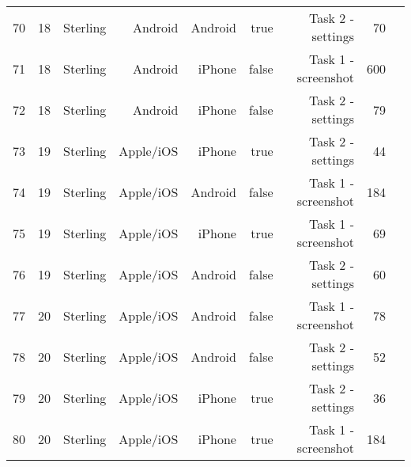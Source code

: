 \documentclass[conference]{IEEEtran}
\begin{document}
\begin{table}[!htp]
\begin{tabular}{lrrrrrrrr}
70 &18 &Sterling &Android &Android &true &Task 2 - settings &70 \\
71 &18 &Sterling &Android &iPhone &false &Task 1 - screenshot &600 \\
72 &18 &Sterling &Android &iPhone &false &Task 2 - settings &79 \\
73 &19 &Sterling &Apple/iOS &iPhone &true &Task 2 - settings &44 \\
74 &19 &Sterling &Apple/iOS &Android &false &Task 1 - screenshot &184 \\
75 &19 &Sterling &Apple/iOS &iPhone &true &Task 1 - screenshot &69 \\
76 &19 &Sterling &Apple/iOS &Android &false &Task 2 - settings &60 \\
77 &20 &Sterling &Apple/iOS &Android &false &Task 1 - screenshot &78 \\
78 &20 &Sterling &Apple/iOS &Android &false &Task 2 - settings &52 \\
79 &20 &Sterling &Apple/iOS &iPhone &true &Task 2 - settings &36 \\
80 &20 &Sterling &Apple/iOS &iPhone &true &Task 1 - screenshot &184 \\
\bottomrule
\end{tabular}
\end{table}
\end{document}

